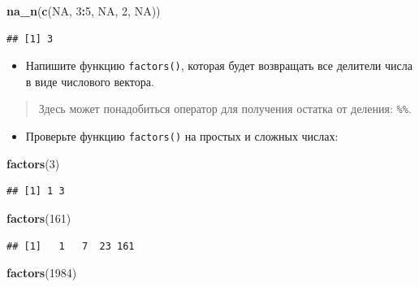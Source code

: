 \documentclass[]{book}
\newenvironment{Shaded}{\begin{snugshade}}{\end{snugshade}}
\newcommand{\KeywordTok}[1]{\textcolor[rgb]{0.13,0.29,0.53}{\textbf{#1}}}
\newcommand{\DecValTok}[1]{\textcolor[rgb]{0.00,0.00,0.81}{#1}}
\newcommand{\OtherTok}[1]{\textcolor[rgb]{0.56,0.35,0.01}{#1}}
\newcommand{\OperatorTok}[1]{\textcolor[rgb]{0.81,0.36,0.00}{\textbf{#1}}}
\newcommand{\NormalTok}[1]{#1}
\providecommand{\tightlist}{%
  \setlength{\itemsep}{0pt}\setlength{\parskip}{0pt}}
\begin{document}
\begin{Shaded}
\begin{Highlighting}[]
\KeywordTok{na_n}\NormalTok{(}\KeywordTok{c}\NormalTok{(}\OtherTok{NA}\NormalTok{, }\DecValTok{3}\OperatorTok{:}\DecValTok{5}\NormalTok{, }\OtherTok{NA}\NormalTok{, }\DecValTok{2}\NormalTok{, }\OtherTok{NA}\NormalTok{))}
\end{Highlighting}
\end{Shaded}

\begin{verbatim}
## [1] 3
\end{verbatim}

\begin{itemize}
\tightlist
\item
  Напишите функцию \texttt{factors()}, которая будет возвращать все
  делители числа в виде числового вектора.
\end{itemize}

\begin{quote}
Здесь может понадобиться оператор для получения остатка от деления:
\texttt{\%\%}.
\end{quote}

\begin{itemize}
\tightlist
\item
  Проверьте функцию \texttt{factors()} на простых и сложных числах:
\end{itemize}

\begin{Shaded}
\begin{Highlighting}[]
\KeywordTok{factors}\NormalTok{(}\DecValTok{3}\NormalTok{)}
\end{Highlighting}
\end{Shaded}

\begin{verbatim}
## [1] 1 3
\end{verbatim}

\begin{Shaded}
\begin{Highlighting}[]
\KeywordTok{factors}\NormalTok{(}\DecValTok{161}\NormalTok{)}
\end{Highlighting}
\end{Shaded}

\begin{verbatim}
## [1]   1   7  23 161
\end{verbatim}

\begin{Shaded}
\begin{Highlighting}[]
\KeywordTok{factors}\NormalTok{(}\DecValTok{1984}\NormalTok{)}
\end{Highlighting}
\end{Shaded}
\end{document}
